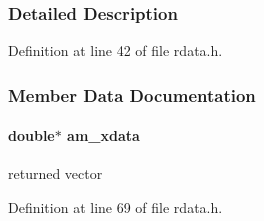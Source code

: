 \subsubsection{Detailed Description}


Definition at line 42 of file rdata.\+h.



\subsubsection{Member Data Documentation}
\hypertarget{struct_return_data_ad99b08eb835733c2416a1a0004e4a491}{}
\paragraph[{am\+\_\+xdata}]{\setlength{\rightskip}{0pt plus 5cm}double$\ast$ am\+\_\+xdata}\label{struct_return_data_ad99b08eb835733c2416a1a0004e4a491}
returned vector 

Definition at line 69 of file rdata.\+h.

